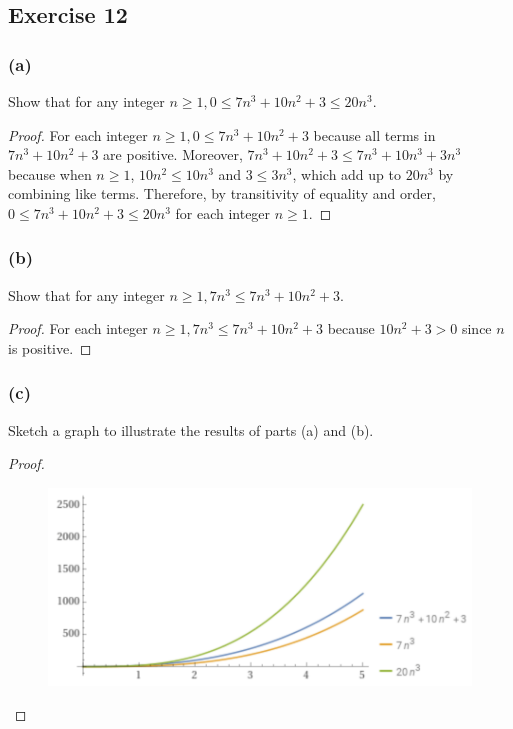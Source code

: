 \documentclass[14pt]{extarticle}
\begin{document}
\subsection{Exercise 12}
\subsubsection{(a)}
Show that for any integer \(n \geq 1, 0 \leq 7n^3 + 10n^2 + 3 \leq 20n^3\).

\begin{proof}
    For each integer \(n \geq 1, 0 \leq 7n^3 + 10n^2 + 3\) because all terms in \(7n^3 + 10n^2 + 3\) are positive. Moreover,
    \(7n^3 + 10n^2 + 3 \leq 7n^3 + 10n^3 + 3n^3\) because when \(n \geq 1\), \(10n^2 \leq 10n^3\) and \(3 \leq 3n^3\), which add
    up to \(20n^3\) by combining like terms. Therefore, by transitivity of equality and order, \(0 \leq 7n^3 + 10n^2 + 3
    \leq 20n^3\) for each integer \(n \geq 1\).
\end{proof}

\subsubsection{(b)}
Show that for any integer \(n \geq 1, 7n^3 \leq 7n^3 + 10n^2 + 3\).

\begin{proof}
    For each integer \(n \geq 1, 7n^3 \leq 7n^3 + 10n^2 + 3\) because \(10n^2 + 3 > 0\) since \(n\) is positive.
\end{proof}

\subsubsection{(c)}
Sketch a graph to illustrate the results of parts (a) and (b).
\begin{proof}
    \begin{figure}[ht!]
        \centering
        \includegraphics[scale=0.5]{../images/11.2.12.c.png}
    \end{figure}
\end{proof}
\end{document}
